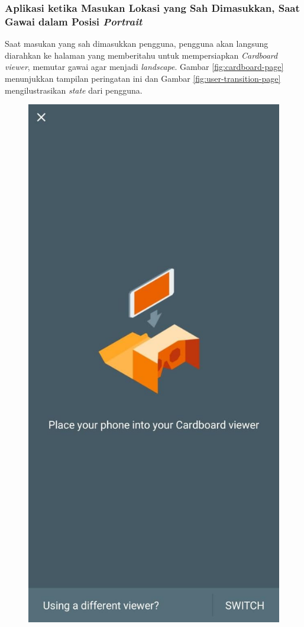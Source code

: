 \subsubsection{Aplikasi ketika Masukan Lokasi yang Sah Dimasukkan, Saat Gawai dalam Posisi \textit{Portrait}}
Saat masukan yang sah dimasukkan pengguna, pengguna akan langsung diarahkan ke halaman yang memberitahu untuk mempersiapkan \textit{Cardboard viewer}, memutar gawai agar menjadi \textit{landscape}. Gambar \ref{fig:cardboard-page} menunjukkan tampilan peringatan ini dan Gambar \ref{fig:user-transition-page} mengilustrasikan \textit{state} dari pengguna.

\begin{figure}
  \includegraphics[scale=0.2]{Gambar/cardboard-page.png}

\end{figure}
